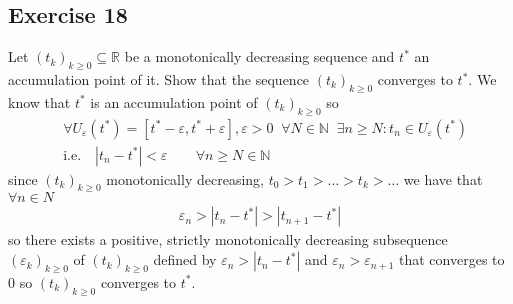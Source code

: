 \subsection{Exercise 18}
Let $(t_k)_{k\ge 0} \subseteq \mathbb{R}$ be a monotonically decreasing
sequence and $t^{*}$ an accumulation point of it. Show that the sequence
$(t_k)_{k\ge 0}$ converges to $t^{*}$.
\newline
We know that $t ^{*}$ is an accumulation point of $(t_k)_{k\ge 0}$ so
\begin{align}
    &\forall U_\varepsilon(t^{*}) = [t^{*}-\varepsilon, t^{*}+\varepsilon],
    \varepsilon>0 \;\; \forall N\in \mathbb{N} \;\; \exists n \ge N: t_n \in
    U_\varepsilon(t^{*})\\
    &\text{i.e.}\quad |t_n - t^{*}| < \varepsilon \qquad \forall n\ge N \in \mathbb{N}
\end{align}
since $(t_k)_{k\ge 0}$ monotonically decreasing, $t_0 > t_1 > \ldots>
t_k > \ldots $ we have that $\forall n \in N$
\begin{align}
    \varepsilon_n  > |t_n - t^{*} | > |t_{n+1} - t^{*}|
\end{align}
so there exists a positive, strictly monotonically decreasing subsequence $\left(
\varepsilon_k \right)_{k\ge 0}$  of $(t_k)_{k\ge 0}$ defined by $\varepsilon_n >
|t_n - t^{*}|$ and $\varepsilon_n > \varepsilon_{n+1}$ that converges to $0$
so $(t_k)_{k\ge 0}$ converges to $t^{*}$.

